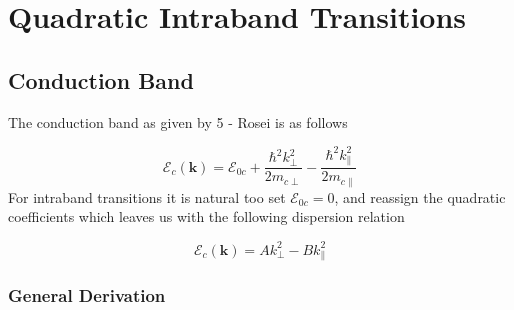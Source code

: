 \newpage
\section{Quadratic Intraband Transitions}
\label{app:quadratic_intraband_transitions}

\subsection{Conduction Band}
The conduction band as given by 5 - Rosei is as follows

\begin{equation}
\mathcal{E}_{c}(\mathbf{k}) = \mathcal{E}_{0c} + \frac{\hbar^2 k_{\perp}^2}{2m_{c\perp}} - \frac{\hbar^2 k_{\parallel}^2}{2m_{c\parallel}} 
\label{eq:quadratic_intraband_conduction_band}
\end{equation}
For intraband transitions it is natural too set $\mathcal{E}_{0c}=0$, and reassign the quadratic coefficients which leaves us with the following dispersion relation

\begin{equation}
\mathcal{E}_{c}(\mathbf{k}) = Ak_{\perp}^{2} -  Bk_{\parallel}^{2} 
\label{eq:quadratic_intraband_conduction_band_simple}
\end{equation}
\subsubsection{General Derivation}

